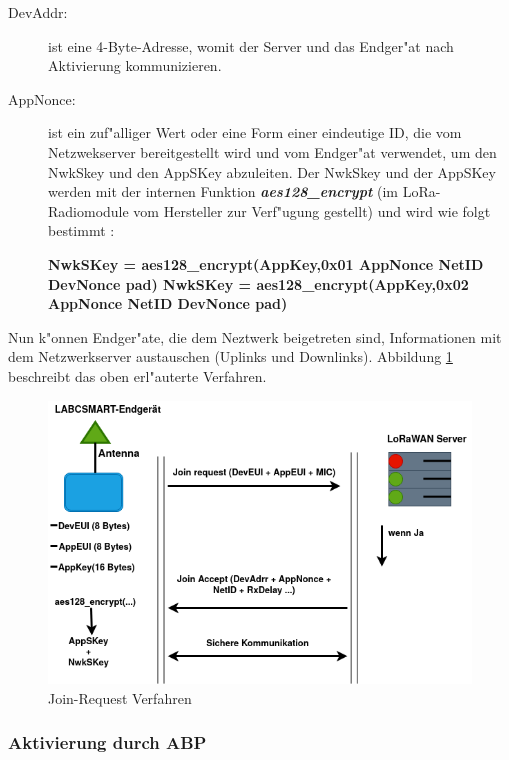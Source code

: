 \begin{description}
	\item[DevAddr:] ist eine 4-Byte-Adresse, womit der Server und das Endger"at nach Aktivierung kommunizieren.   
	
	\item[AppNonce:] ist ein zuf"alliger Wert oder eine Form einer eindeutige ID, die vom Netzwekserver bereitgestellt wird und vom Endger"at verwendet, um den NwkSkey und den AppSKey abzuleiten.
	Der NwkSkey und der AppSKey werden mit der internen Funktion   \textbf{\textit{aes128\_encrypt}} (im LoRa-Radiomodule vom Hersteller zur Verf"ugung gestellt) und wird wie folgt bestimmt \cite{LoRaWAN}:
	
	\textbf{NwkSKey = aes128\_encrypt(AppKey,0x01 \textbar AppNonce \textbar NetID \textbar DevNonce \textbar pad)
	NwkSKey = aes128\_encrypt(AppKey,0x02 \textbar AppNonce \textbar NetID \textbar DevNonce \textbar pad)} 
\end{description}

Nun k"onnen Endger"ate, die dem Neztwerk beigetreten sind, Informationen mit dem Netzwerkserver austauschen (Uplinks und Downlinks). Abbildung \ref{fig:request} beschreibt das oben erl"auterte Verfahren.


\begin{figure}[h]
	\centering
	\includegraphics[width=14cm]{source/images/Join-Procedure}
	\caption{Join-Request Verfahren\label{fig:request}}
\end{figure}


\vspace{10cm}
\subsubsection{Aktivierung durch ABP}

